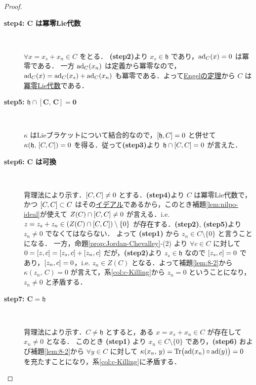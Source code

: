\documentclass[rep_main]{subfiles}
\begin{document}
\begin{proof}
\begin{description}
		\item[\textbf{step4: $\bm{C}$ は冪零Lie代数}]　
		
		$\forall x = x_s + x_n\in C$ をとる．
		\textsf{\textbf{(step2)}}より $x_s \in \mathfrak{h}$ であり，$\operatorname{ad}_C(x) = 0$ は冪零である．
		一方 $\operatorname{ad}_C(x_n)$ は定義から冪零なので，$\operatorname{ad}_C(x) = \operatorname{ad}_C(x_s) + \operatorname{ad}_C(x_n)$ も冪零である．よって\hyperref[thm:Engel]{Engelの定理}から $C$ は\hyperref[def:nilpotent-LieAlg]{冪零Lie代数}である．

		\item[\textbf{step5: $\bm{\mathfrak{h} \cap [C,\, C] = 0}$}]　
		
		$\kappa$ はLieブラケットについて結合的なので，$\comm{\mathfrak{h}}{C} = 0$ と併せて $\kappa(\mathfrak{h},\, \comm{C}{C}) = 0$ を得る．従って\textsf{\textbf{(step3)}}より $\mathfrak{h} \cap \comm{C}{C} = 0$ が言えた．

		\item[\textbf{step6: $\bm{C}$ は可換}]　
		
		背理法により示す．$\comm{C}{C} \neq 0$ とする．\textsf{\textbf{(step4)}}より $C$ は冪零Lie代数で，かつ $\comm{C}{C} \subset C$ はその\hyperref[def:ideal-LieAlg]{イデアル}であるから，このとき補題\ref{lem:nilpo-ideal}が使えて $Z(C)\cap \comm{C}{C} \neq 0$ が言える．i.e. $z = z_s + z_n \in (Z(C)\cap \comm{C}{C}) \setminus \{0\}$ が存在する．\textsf{\textbf{(step2)}}, \textsf{\textbf{(step5)}}より $z_n \neq 0$ でなくてはならない．
		よって \textsf{\textbf{(step1)}} から $z_n \in C \setminus \{0\}$ と言うことになる．
		一方，命題\ref{prop:Jordan-Chevalley}-(2) より $\forall c \in C$ に対して $0 = \comm{z}{c} = \comm{z_s}{c} + \comm{z_n}{c}$ だが，\textsf{\textbf{(step2)}}より $z_s \in \mathfrak{h}$ なので $\comm{z_s}{c} = 0$ であり，$\comm{z_n}{c} = 0$，i.e. $z_n \in Z(C)$ となる．よって補題\ref{lem:8-2}から $\kappa(z_n,\, C) = 0$ が言えて，系\ref{col:c-Killing}から $z_n = 0$ ということになり，$z_n \neq 0$ と矛盾する．

		\item[\textbf{step7: $\bm{C = \mathfrak{h}}$}]　
		
		背理法により示す．$C \neq \mathfrak{h}$ とすると，ある $x = x_s + x_n \in C$ が存在して $x_n \neq 0$ となる．
		このとき \textsf{\textbf{(step1)}} より $x_n \in C \setminus \{0\}$ であり，\textsf{\textbf{(step6)}} および補題\ref{lem:8-2}から $\forall y \in C$ に対して $\kappa(x_n,\, y) = \Tr \bigl( \operatorname{ad}(x_n) \circ  \operatorname{ad}(y)\bigr) = 0$ を充たすことになり，系\ref{col:c-Killing}に矛盾する．
	\end{description}
\end{proof}
\end{document}
